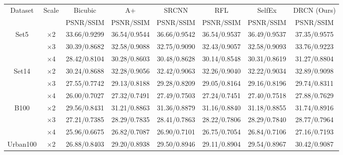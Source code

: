 \documentclass[10pt,twocolumn,letterpaper]{article}
\begin{document}
\begin{table}
\begin{center}
\setlength{\tabcolsep}{2pt}
\footnotesize
\begin{tabular}{ | c | c | c | c | c | c | c | c | }
\hline
\multirow{2}{*}{Dataset} & \multirow{2}{*}{Scale} & Bicubic & A+ & SRCNN & RFL & SelfEx & DRCN (Ours)\\
 & & PSNR/SSIM & PSNR/SSIM & PSNR/SSIM & PSNR/SSIM & PSNR/SSIM & PSNR/SSIM\\
\hline
\hline
\multirow{3}{*}{Set5} & $\times$2 & 33.66/0.9299 & 36.54/{\color{blue}0.9544} & {\color{blue}36.66}/0.9542 & 36.54/0.9537 & 36.49/0.9537 & {\color{red}37.35}/{\color{red}0.9575}\\
 & $\times$3 & 30.39/0.8682 & 32.58/0.9088 & {\color{blue}32.75}/0.9090 & 32.43/0.9057 & 32.58/{\color{blue}0.9093} & {\color{red}33.76}/{\color{red}0.9223}\\
 & $\times$4 & 28.42/0.8104 & 30.28/0.8603 & {\color{blue}30.48}/{\color{blue}0.8628} & 30.14/0.8548 & 30.31/0.8619 & {\color{red}31.27}/{\color{red}0.8804}\\
\hline
\hline
\multirow{3}{*}{Set14} & $\times$2 & 30.24/0.8688 & 32.28/0.9056 & {\color{blue}32.42}/{\color{blue}0.9063} & 32.26/0.9040 & 32.22/0.9034 & {\color{red}32.89}/{\color{red}0.9098}\\
 & $\times$3 & 27.55/0.7742 & 29.13/0.8188 & {\color{blue}29.28}/{\color{blue}0.8209} & 29.05/0.8164 & 29.16/0.8196 & {\color{red}29.74}/{\color{red}0.8311}\\
 & $\times$4 & 26.00/0.7027 & 27.32/0.7491 & {\color{blue}27.49}/0.7503 & 27.24/0.7451 & 27.40/{\color{blue}0.7518} & {\color{red}27.88}/{\color{red}0.7629}\\
\hline
\hline
\multirow{3}{*}{B100} & $\times$2 & 29.56/0.8431 & 31.21/0.8863 & {\color{blue}31.36}/{\color{blue}0.8879} & 31.16/0.8840 & 31.18/0.8855 & {\color{red}31.74}/{\color{red}0.8916}\\
 & $\times$3 & 27.21/0.7385 & 28.29/0.7835 & {\color{blue}28.41}/{\color{blue}0.7863} & 28.22/0.7806 & 28.29/0.7840 & {\color{red}28.77}/{\color{red}0.7964}\\
 & $\times$4 & 25.96/0.6675 & 26.82/0.7087 & {\color{blue}26.90}/0.7101 & 26.75/0.7054 & 26.84/{\color{blue}0.7106} & {\color{red}27.16}/{\color{red}0.7193}\\
\hline
\hline
\multirow{3}{*}{Urban100} & $\times$2 & 26.88/0.8403 & 29.20/0.8938 & 29.50/0.8946 & 29.11/0.8904 & {\color{blue}29.54}/{\color{blue}0.8967} & {\color{red}30.42}/{\color{red}0.9087}\\

\end{tabular}
\end{center}
\end{table}
\end{document}
